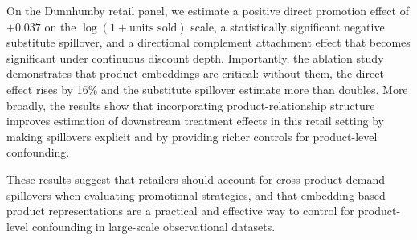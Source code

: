 \documentclass[conference]{IEEEtran}
\begin{document}
On the Dunnhumby retail panel, we estimate a positive direct promotion effect
of $+0.037$ on the $\log(1 + \text{units sold})$ scale, a statistically
significant negative substitute spillover, and a directional complement
attachment effect that becomes significant under continuous discount depth.
Importantly, the ablation study demonstrates that product embeddings are
critical: without them, the direct effect rises by 16\% and the substitute
spillover estimate more than doubles.
More broadly, the results show that incorporating product-relationship
structure improves estimation of downstream treatment effects in this retail
setting by making spillovers explicit and by providing richer controls for
product-level confounding.

These results suggest that retailers should account for cross-product demand
spillovers when evaluating promotional strategies, and that embedding-based
product representations are a practical and effective way to control for
product-level confounding in large-scale observational datasets.




\end{document}
